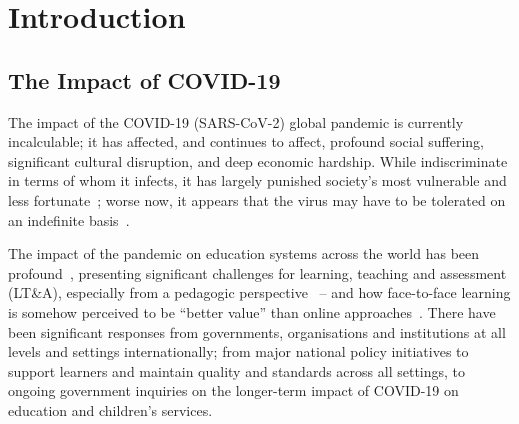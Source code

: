 \documentclass[sigconf]{acmart}
\begin{document}


\maketitle

\section{Introduction}\label{intro}

\subsection{The Impact of COVID-19}

The impact of the COVID-19 (SARS-CoV-2) global pandemic is currently
incalculable; it has affected, and continues to affect, profound
social suffering, significant cultural disruption, and deep economic
hardship. While indiscriminate in terms of whom it infects, it has
largely punished society’s most vulnerable and less
fortunate~\cite{vonbraun-et-al:2020,lancetcovid:2020,vanlancker+parolin:2020};
worse now, it appears that the virus may have to be tolerated on an
indefinite basis~\cite{kissler-et-al:2020}.

The impact of the pandemic on education systems across the world has
been profound~\cite{unescocovidedu:2020,armitage+nellums:2020},
presenting significant challenges for learning, teaching and
assessment (LT\&A), especially from a pedagogic
perspective~\cite{doucet-et-al:2020,oecd:2020,aace:2020} -- and how
face-to-face learning is somehow perceived to be ``better value'' than
online approaches~\cite{paechter+maier:ihe2010,scbbcnews:2020}. There
have been significant responses from governments, organisations and
institutions at all levels and settings internationally; from major
national policy initiatives to support learners and maintain quality
and standards across all settings, to ongoing government inquiries on
the longer-term impact of COVID-19 on education and children’s
services.
\end{document}
